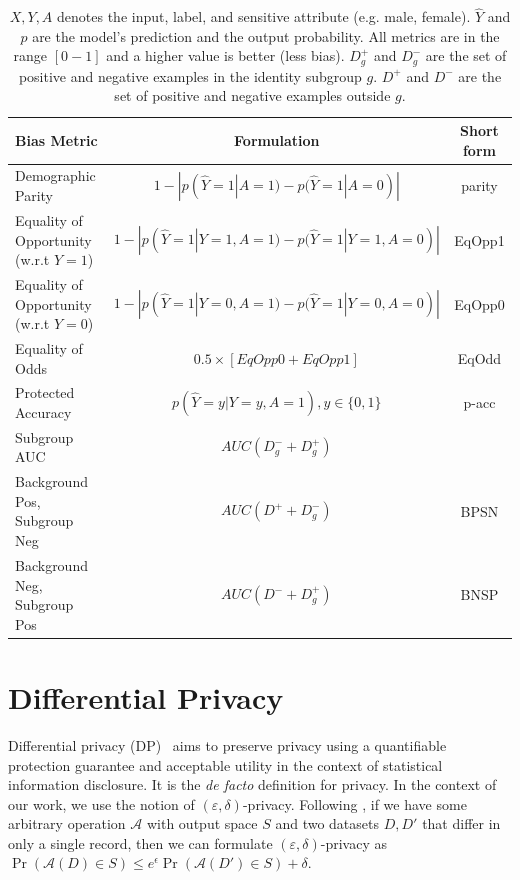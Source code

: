 \documentclass[11pt]{article} %
\begin{document}
\begin{table}[htb]
\centering
\begin{adjustbox}{max width=\textwidth}
\begin{tabular}{@{}lcc@{}}
\toprule
\textbf{Bias Metric} &\textbf{Formulation} & \textbf{Short form} \\
\midrule
Demographic Parity  \cite{hardt2016equality} & $1-|p(\hat{Y} = 1 |A=1) - p(\hat{Y} = 1 |A=0)|$ & parity \\
Equality of Opportunity (w.r.t $Y = 1$) & $1-|p(\hat{Y} = 1 | Y = 1, A=1) - p(\hat{Y} = 1 | Y= 1, A=0)|$ & EqOpp1\\
Equality of Opportunity (w.r.t $Y = 0$) & $1-|p(\hat{Y} = 1 | Y = 0, A=1) - p(\hat{Y} = 1 | Y= 0, A=0)|$ & EqOpp0\\
Equality of Odds \cite{hardt2016equality} & $ 0.5 \times [EqOpp0 + EqOpp1] $ & EqOdd \\
Protected Accuracy \cite{reddy2021benchmarking} & $p(\hat{Y} = y |Y=y, A=1), y \in \{0, 1\}$ & p-acc \\
Subgroup AUC \cite{borkan2019nuanced} & $AUC(D^-_g + D^+_g)$ & \\
Background Pos, Subgroup Neg \cite{borkan2019nuanced} & $AUC(D^+ + D^-_g)$ & BPSN \\
Background Neg, Subgroup Pos \cite{borkan2019nuanced} & $AUC(D^- + D^+_g)$ & BNSP \\
\bottomrule
\end{tabular}
\end{adjustbox}
\caption{$X, Y, A$ denotes the input, label, and sensitive attribute (e.g. male, female). $\hat{Y}$ and $p$ are the model’s prediction and the output probability. All metrics are in the range $[0-1]$ and a higher value is better (less bias). $D^+_g$ and $D^-_g$ are the set of positive and negative examples in the identity subgroup $g$. $D^+$ and $D^-$ are the set of positive and negative examples outside $g$.} 
\label{table:bias_metrics}
\end{table}


\section{Differential Privacy} \label{section:privacy}
Differential privacy (DP)~\cite{dwork2006calibrating} aims to preserve privacy using a quantifiable protection guarantee and acceptable utility in the context of statistical information disclosure.  It is the {\it de facto} definition for privacy. 
In the context of our work, we use the notion of $(\varepsilon, \delta)$-privacy. Following \cite{dwork2006calibrating}, if we have some arbitrary operation $\mathcal{A}$ with output space $S$ and two datasets $D, D'$ that differ in only a single record, then we can formulate $(\varepsilon, \delta)$-privacy as 
$
    \operatorname{Pr}(\mathcal{A}(D)\in S)\leq e^{\epsilon} \operatorname{Pr}(\mathcal{A}(D')\in S)+\delta.$
\end{document}
